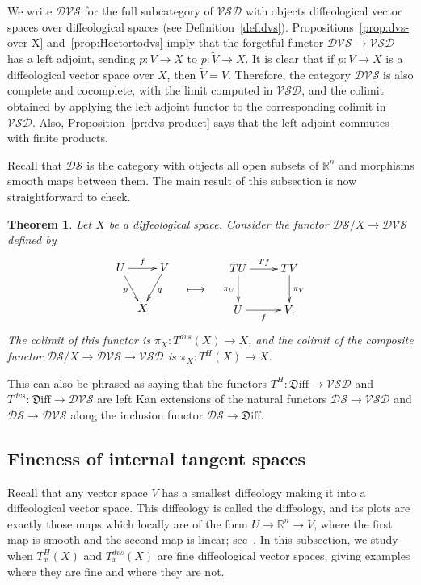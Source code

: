 \documentclass[12pt]{amsart}
\newcommand{\dfn}[1]{\textbf{\boldmath{#1}}}
\newtheorem{thm}[de]{Theorem}
\theoremstyle{remark}
\newcommand{\ra}{\to}
\newcommand{\Diff}{{\mathfrak{D}\mathrm{iff}}}
\newcommand{\DS}{{\mathcal{DS}}}
\newcommand{\VSD}{{\mathcal{VSD}}}
\newcommand{\DVS}{{\mathcal{DVS}}}
\def \R{\mathbb{R}}
\begin{document}
We write $\DVS$ for the full subcategory of $\VSD$ with objects
diffeological vector spaces over diffeological spaces (see Definition~\ref{def:dvs}).
Propositions~\ref{prop:dvs-over-X} and~\ref{prop:Hectortodvs} imply that
the forgetful functor $\DVS \ra \VSD$ has a left adjoint,
sending $p:V \ra X$ to $p:\tilde{V} \ra X$.
It is clear that if $p:V \ra X$ is a diffeological vector space over $X$,
then $\tilde{V}=V$.
Therefore, the category $\DVS$ is also complete and cocomplete,
with the limit computed in $\VSD$,
and the colimit obtained by applying the left adjoint functor
to the corresponding colimit in $\VSD$.
Also, Proposition~\ref{pr:dvs-product} says that
the left adjoint commutes with finite products.

\medskip

Recall that $\DS$ is the category with objects all open subsets of $\R^n$
and morphisms smooth maps between them.
The main result of this subsection is now straightforward to check.

\begin{thm}\label{thm:dvs-vs-Hector}
Let $X$ be a diffeological space.
Consider the functor $\DS/X \ra \DVS$ defined by
\[
\vcenter{\xymatrix@C5pt@R-5pt{U \ar[dr]_-p \ar[rr]^f & & V \ar[dl]^-q \\ & X_{\strut} }}
\quad\longmapsto\quad
\vcenter{\xymatrix{TU \ar[r]^{Tf} \ar[d]_{\pi_U} & TV \ar[d]^{\pi_V} \\ U \ar[r]_f & V.}}
\]
The colimit of this functor is $\pi_X: T^{dvs}(X) \ra X$,
and the colimit of the composite functor $\DS/X \ra \DVS \ra \VSD$
is $\pi_X:T^H(X) \ra X$.
\end{thm}

This can also be phrased as saying that
the functors $T^H:\Diff \ra \VSD$ and $T^{dvs}:\Diff \ra \DVS$ are
left Kan extensions of the natural functors
$\DS \ra \VSD$ and $\DS \ra \DVS$
along the inclusion functor $\DS \to \Diff$.

\subsection{Fineness of internal tangent spaces}\label{ss:fine}

Recall that any vector space $V$ has a smallest diffeology making it into a
diffeological vector space.
This diffeology is called the \dfn{fine} diffeology,
and its plots are exactly those maps which locally are of the
form $U \to \R^n \to V$, where the first map is smooth and the
second map is linear; see~\cite[Chapter~3]{I3}.
In this subsection, we study when $T^H_x(X)$ and $T^{dvs}_x(X)$ are
fine diffeological vector spaces, giving examples where they are
fine and where they are not.
\end{document}

